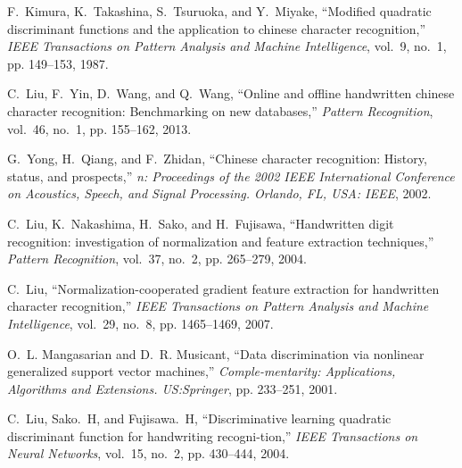 \documentclass[conference]{IEEEtran}
\begin{document}

%
%
%
\begin{thebibliography}{1}
  
F.~Kimura, K.~Takashina, S.~Tsuruoka, and Y.~Miyake, ``Modified quadratic
discriminant functions and the application to chinese character
recognition,'' \emph{IEEE Transactions on Pattern Analysis and Machine
	Intelligence}, vol.~9, no.~1, pp. 149--153, 1987.

C.~Liu, F.~Yin, D.~Wang, and Q.~Wang, ``Online and offline handwritten chinese
character recognition: Benchmarking on new databases,'' \emph{Pattern
	Recognition}, vol.~46, no.~1, pp. 155--162, 2013.

G.~Yong, H.~Qiang, and F.~Zhidan, ``Chinese character recognition: History,
status, and prospects,'' \emph{n: Proceedings of the 2002 IEEE International
	Conference on Acoustics, Speech, and Signal Processing. Orlando, FL, USA:
	IEEE}, 2002.

C.~Liu, K.~Nakashima, H.~Sako, and H.~Fujisawa, ``Handwritten digit
recognition: investigation of normalization and feature extraction
techniques,'' \emph{Pattern Recognition}, vol.~37, no.~2, pp. 265--279, 2004.

C.~Liu, ``Normalization-cooperated gradient feature extraction for handwritten
character recognition,'' \emph{IEEE Transactions on Pattern Analysis and
	Machine Intelligence}, vol.~29, no.~8, pp. 1465--1469, 2007.

O.~L. Mangasarian and D.~R. Musicant, ``Data discrimination via nonlinear
generalized support vector machines,'' \emph{Comple-mentarity: Applications,
	Algorithms and Extensions. US:Springer}, pp. 233--251, 2001.

C.~Liu, Sako.~H, and Fujisawa.~H, ``Discriminative learning quadratic
discriminant function for handwriting recogni-tion,'' \emph{IEEE Transactions
	on Neural Networks}, vol.~15, no.~2, pp. 430--444, 2004.


\end{thebibliography}
\end{document}
